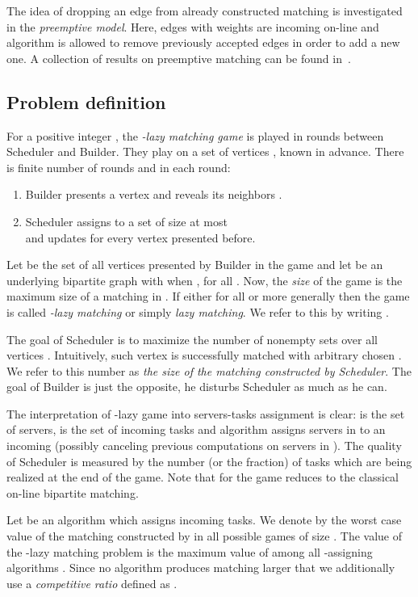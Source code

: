 \documentclass[12pt]{amsart}
\theoremstyle{definition}
\newcommand{\Br}{Builder\xspace}
\newcommand{\Sr}{Scheduler\xspace}
\begin{document}
The idea of dropping an edge from already constructed matching
is investigated in the \emph{preemptive model}. 
Here, edges with weights are incoming on-line and algorithm is allowed to remove previously accepted edges in order to add a new one.
A collection of results on preemptive matching can be found in~\cite{CTV2015,ELSW2013}.


\subsection{Problem definition}\label{sec:definition}


For a positive integer , the \emph{-lazy matching game} is played in rounds between \Sr and \Br. 
They play on a set of vertices , known in advance.
There is finite number of rounds and in each round:
\begin{enumerate}
	\item \Br presents a vertex  and reveals its neighbors .
	\item \Sr assigns to  a set  of size at most  \label{game:2}\\
	  and updates  for every vertex  presented before.
\end{enumerate}
Let  be the set of all vertices presented by \Br in the game and let  be an underlying bipartite graph with  when , for all .
Now, the \emph{size}  of the game is the maximum size of a matching in .
{If either  for all  or more generally  then the game is called \emph{-lazy matching} or simply \emph{lazy matching}.} We refer to this by writing .

The goal of \Sr is to maximize the number of nonempty sets  over all vertices . 
Intuitively, such vertex  is successfully matched with arbitrary chosen . 
We  refer to this number as \emph{the size of the matching constructed by Scheduler}.
The goal of \Br is just the opposite, he disturbs \Sr as much as he can.

The interpretation of -lazy game into servers-tasks assignment is clear:  is the set of servers,  is the set of incoming tasks
and algorithm assigns servers in  to an incoming  (possibly canceling previous computations on servers in ).
The quality of Scheduler is measured by the number (or the fraction) of tasks which are being realized at the end of the game. 
Note that for  the game reduces to the classical on-line bipartite matching.

Let  be an algorithm which assigns incoming tasks. 
We denote by  the worst case value of the matching constructed by  in all possible games of size . 
The value of the -lazy matching problem  is the maximum value of  among all -assigning algorithms . 
Since no algorithm produces matching larger that  we additionally use a \emph{competitive ratio} defined as
.
 
\end{document}
